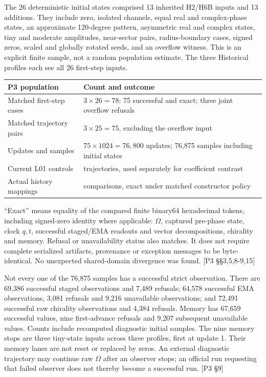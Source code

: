 \documentclass[
  11pt,
  a4paper,
]{article}
\newcounter{none} %
\begin{document}
The 26 deterministic initial states comprised 13 inherited H2/H6B inputs and 13 additions. They include zero, isolated channels, equal real and complex-phase states, an approximate 120-degree pattern, asymmetric real and complex states, tiny and moderate amplitudes, near-sector pairs, radius-boundary cases, signed zeros, scaled and globally rotated seeds, and an overflow witness. This is an explicit finite sample, not a random population estimate. The three Historical profiles each see all 26 first-step inputs.

{\def\LTcaptype{none} %
\begin{longtable}[]{@{}
  >{\raggedright\arraybackslash}p{}
  >{\raggedright\arraybackslash}p{}@{}}
\toprule\noalign{}
\begin{minipage}[b]{\linewidth}\raggedright
P3 population
\end{minipage} & \begin{minipage}[b]{\linewidth}\raggedright
Count and outcome
\end{minipage} \\
\midrule\noalign{}
\endhead
\bottomrule\noalign{}
\endlastfoot
Matched first-step cases & \(3\times26=78\): 75 successful and exact; three joint overflow refusals \\
Matched trajectory pairs & \(3\times25=75\), excluding the overflow input \\
Updates and samples & \(75\times1024=76{,}800\) updates; 76,875 samples including initial states \\
Current L01 controls & 25 trajectories, used separately for coefficient contrast \\
Actual history mappings & 16 comparisons, exact under matched constructor policy \\
\end{longtable}
}

``Exact'' means equality of the compared finite binary64 hexadecimal tokens, including signed-zero identity where applicable: \(\Omega\), captured pre-phase state, clock \(q,t\), successful staged/EMA readouts and vector decompositions, chirality and memory. Refusal or unavailability status also matches. It does not require complete serialized artifacts, provenance or exception messages to be byte-identical. No unexpected shared-domain divergence was found. {[}P3 §§3,5,8-9,15{]}

Not every one of the 76,875 samples has a successful strict observation. There are 69,386 successful staged observations and 7,489 refusals; 64,578 successful EMA observations, 3,081 refusals and 9,216 unavailable observations; and 72,491 successful raw chirality observations and 4,384 refusals. Memory has 67,659 successful values, nine first-advance refusals and 9,207 subsequent unavailable values. Counts include recomputed diagnostic initial samples. The nine memory stops are three tiny-state inputs across three profiles, first at update 1. Their memory lanes are not reset or replaced by zeros. An external diagnostic trajectory may continue raw \(\Omega\) after an observer stops; an official run requesting that failed observer does not thereby become a successful run. {[}P3 §9{]}
\end{document}
